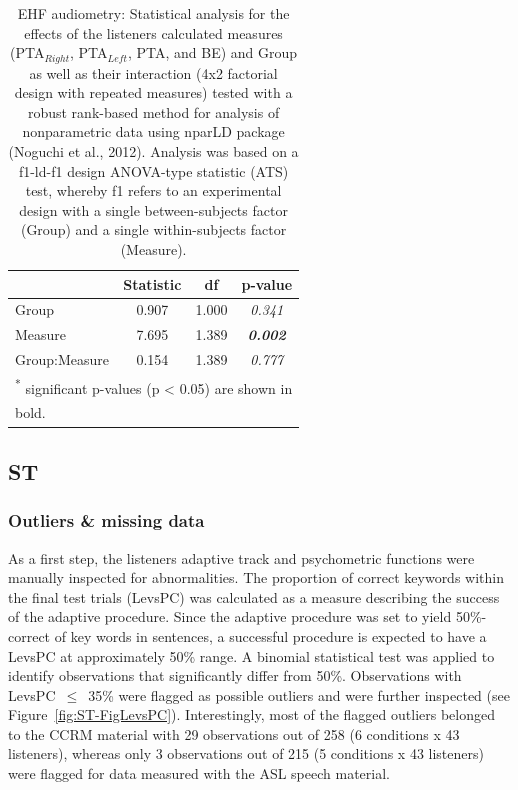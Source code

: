 \documentclass[a4paper, twoside]{templates/ociamthesis}
\begin{document}
\begin{table}

\caption{\label{tab:EHF-PTATabnparLD}EHF audiometry: Statistical analysis for the effects of the listeners calculated measures (PTA$_{Right}$, PTA$_{Left}$, PTA, and BE) and Group as well as their interaction (4x2 factorial design with repeated measures) tested with a robust rank-based method for analysis of nonparametric data using nparLD package (Noguchi et al., 2012). Analysis was based on a f1-ld-f1 design ANOVA-type statistic (ATS) test, whereby f1 refers to an experimental design with a single between-subjects factor (Group) and a single within-subjects factor (Measure).}
\centering
\begin{tabular}[t]{lcc>{}c}
\toprule
  & Statistic & df & p-value\\
\midrule
Group & 0.907 & 1.000 & \em{0.341}\\
Measure & 7.695 & 1.389 & \em{\textbf{0.002}}\\
Group:Measure & 0.154 & 1.389 & \em{0.777}\\
\bottomrule
\multicolumn{4}{l}{\textsuperscript{*} significant p-values (p < 0.05) are shown in}\\
\multicolumn{4}{l}{bold.}\\
\end{tabular}
\end{table}

\hypertarget{st}{%
\subsection{ST}\label{st}}

\hypertarget{outliers-missing-data}{%
\subsubsection*{Outliers \& missing data}\label{outliers-missing-data}}

As a first step, the listeners adaptive track and psychometric functions were manually inspected for abnormalities. The proportion of correct keywords within the final test trials (LevsPC) was calculated as a measure describing the success of the adaptive procedure. Since the adaptive procedure was set to yield 50\%-correct of key words in sentences, a successful procedure is expected to have a LevsPC at approximately 50\% range. A binomial statistical test was applied to identify observations that significantly differ from 50\%. Observations with LevsPC~\(\leq\)~35\% were flagged as possible outliers and were further inspected (see Figure~\ref{fig:ST-FigLevsPC}). Interestingly, most of the flagged outliers belonged to the CCRM material with 29 observations out of 258 (6 conditions x 43 listeners), whereas only 3 observations out of 215 (5 conditions x 43 listeners) were flagged for data measured with the ASL speech material.\\
\end{document}
